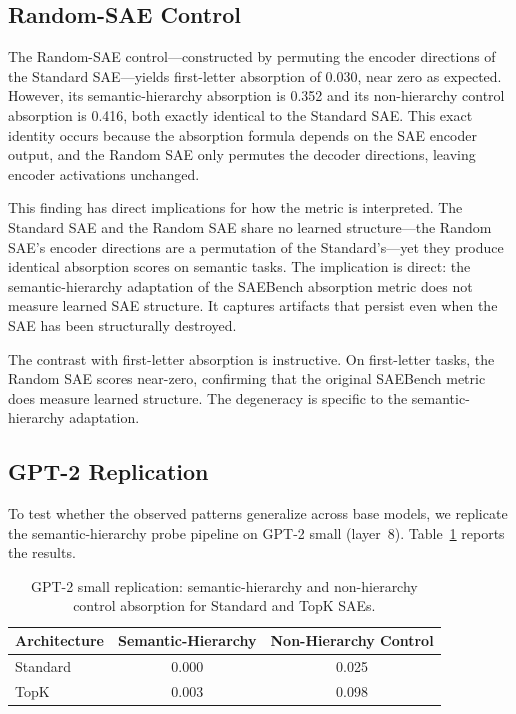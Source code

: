 \documentclass{article}
\begin{document}
\subsection{Random-SAE Control}

The Random-SAE control---constructed by permuting the encoder directions of the Standard SAE---yields first-letter absorption of 0.030, near zero as expected. However, its semantic-hierarchy absorption is 0.352 and its non-hierarchy control absorption is 0.416, both exactly identical to the Standard SAE. This exact identity occurs because the absorption formula depends on the SAE encoder output, and the Random SAE only permutes the decoder directions, leaving encoder activations unchanged.

This finding has direct implications for how the metric is interpreted. The Standard SAE and the Random SAE share no learned structure---the Random SAE's encoder directions are a permutation of the Standard's---yet they produce identical absorption scores on semantic tasks. The implication is direct: the semantic-hierarchy adaptation of the SAEBench absorption metric does not measure learned SAE structure. It captures artifacts that persist even when the SAE has been structurally destroyed.

The contrast with first-letter absorption is instructive. On first-letter tasks, the Random SAE scores near-zero, confirming that the original SAEBench metric does measure learned structure. The degeneracy is specific to the semantic-hierarchy adaptation.

\subsection{GPT-2 Replication}

To test whether the observed patterns generalize across base models, we replicate the semantic-hierarchy probe pipeline on GPT-2 small (layer~8). Table~\ref{tab:gpt2} reports the results.

\begin{table}[t]
\caption{GPT-2 small replication: semantic-hierarchy and non-hierarchy control absorption for Standard and TopK SAEs.}
\label{tab:gpt2}
\centering
\begin{tabular}{lcc}
\toprule
Architecture & Semantic-Hierarchy & Non-Hierarchy Control \\
\midrule
Standard & 0.000 & 0.025 \\
TopK & 0.003 & 0.098 \\
\bottomrule
\end{tabular}
\end{table}
\end{document}
